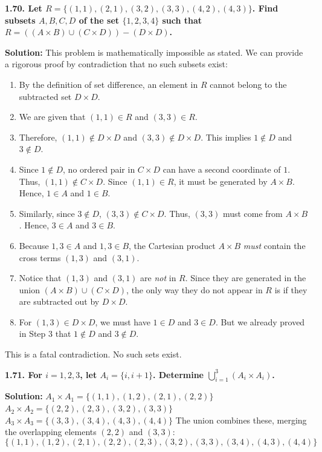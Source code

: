 \documentclass[12pt]{article}
\begin{document}
\hrulefill

\textbf{1.70. Let $R = \{(1,1), (2,1), (3,2), (3,3), (4,2), (4,3)\}$. Find subsets $A, B, C, D$ of the set $\{1, 2, 3, 4\}$ such that $R = ((A \times B) \cup (C \times D)) - (D \times D)$.}

\textbf{Solution:}
This problem is mathematically impossible as stated. We can provide a rigorous proof by contradiction that no such subsets exist:
\begin{enumerate}
    \item By the definition of set difference, an element in $R$ cannot belong to the subtracted set $D \times D$.
    \item We are given that $(1,1) \in R$ and $(3,3) \in R$.
    \item Therefore, $(1,1) \notin D \times D$ and $(3,3) \notin D \times D$. This implies $1 \notin D$ and $3 \notin D$.
    \item Since $1 \notin D$, no ordered pair in $C \times D$ can have a second coordinate of $1$. Thus, $(1,1) \notin C \times D$. Since $(1,1) \in R$, it must be generated by $A \times B$. Hence, $1 \in A$ and $1 \in B$.
    \item Similarly, since $3 \notin D$, $(3,3) \notin C \times D$. Thus, $(3,3)$ must come from $A \times B$. Hence, $3 \in A$ and $3 \in B$.
    \item Because $1, 3 \in A$ and $1, 3 \in B$, the Cartesian product $A \times B$ \textit{must} contain the cross terms $(1,3)$ and $(3,1)$.
    \item Notice that $(1,3)$ and $(3,1)$ are \textit{not} in $R$. Since they are generated in the union $(A \times B) \cup (C \times D)$, the only way they do not appear in $R$ is if they are subtracted out by $D \times D$.
    \item For $(1,3) \in D \times D$, we must have $1 \in D$ and $3 \in D$. But we already proved in Step 3 that $1 \notin D$ and $3 \notin D$.
\end{enumerate}
This is a fatal contradiction. No such sets exist.

\hrulefill

\textbf{1.71. For $i=1, 2, 3$, let $A_i = \{i, i+1\}$. Determine $\bigcup_{i=1}^3 (A_i \times A_i)$.}

\textbf{Solution:}
$A_1 \times A_1 = \{(1,1), (1,2), (2,1), (2,2)\}$
$A_2 \times A_2 = \{(2,2), (2,3), (3,2), (3,3)\}$
$A_3 \times A_3 = \{(3,3), (3,4), (4,3), (4,4)\}$
The union combines these, merging the overlapping elements $(2,2)$ and $(3,3)$:
\[ \{(1,1), (1,2), (2,1), (2,2), (2,3), (3,2), (3,3), (3,4), (4,3), (4,4)\} \]
\end{document}
